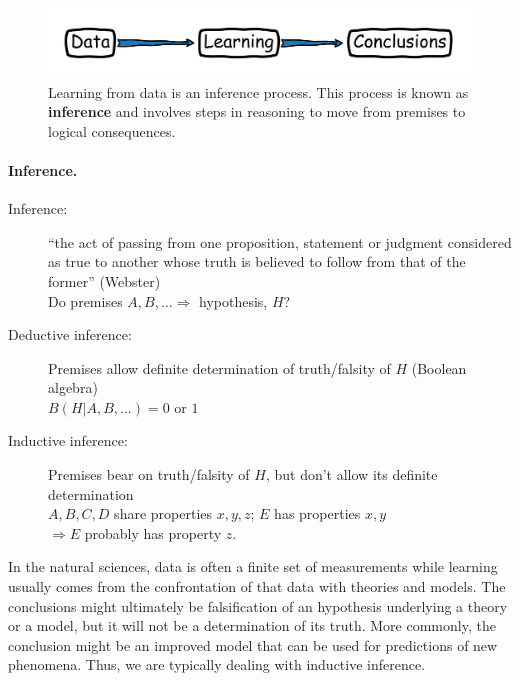 \documentclass[%
oneside,                 %
final,                   %
10pt]{article}
\newenvironment{block_mdfboxadmon}[1][]{
\begin{block_mdfboxmdframed}[frametitle=#1]
}
{
\end{block_mdfboxmdframed}
}
\begin{document}
\begin{figure}[!ht]  %
  \centerline{\includegraphics[width=0.8\linewidth]{fig/inference.png}}
  \caption{
  Learning from data is an inference process. \label{fig-inference} This process is known as \textbf{inference} and involves steps in reasoning to move from premises to logical consequences.
  }
\end{figure}


\paragraph{Inference.}

\begin{block_mdfboxadmon}[]
\begin{description}
\item[Inference:] 
  ``the act of passing from one proposition, statement or judgment considered as true to another whose truth is believed to follow from that of the former'' (Webster) \\
  Do premises $A, B, \ldots \Rightarrow$ hypothesis, $H$? 

\item[Deductive inference:] 
  Premises allow definite determination of truth/falsity of $H$ (Boolean algebra) \\
  $B(H|A,B,...) = 0$ or $1$

\item[Inductive inference:] 
  Premises bear on truth/falsity of $H$, but don’t allow its definite determination\\
  $A, B, C, D$ share properties $x, y, z$; $E$ has properties $x, y$\\
  $\Rightarrow E$ probably has property $z$.
\end{description}

\noindent
\end{block_mdfboxadmon} %



In the natural sciences, data is often a finite set of measurements while learning usually comes from the confrontation of that data with theories and models. The conclusions might ultimately be falsification of an hypothesis underlying a theory or a model, but it will not be a determination of its truth. More commonly, the conclusion might be an improved model that can be used for predictions of new phenomena. Thus, we are typically dealing with inductive inference.
\end{document}
